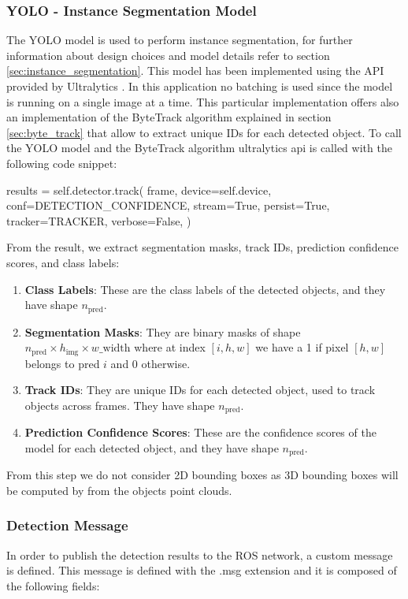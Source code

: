 \subsubsection[YOLO]{YOLO - Instance Segmentation Model}
The YOLO model is used to perform instance segmentation, for further information about 
design choices and model details refer to section \ref{sec:instance_segmentation}.
This model has been implemented using the API provided by Ultralytics \cite{ultralytics_yolo_2023}.
In this application no batching is used since the model is running on a single image at a time.
This particular implementation offers also an implementation of the ByteTrack algorithm explained in section 
\ref{sec:byte_track} that allow to extract unique IDs for each detected object.
To call the YOLO model and the ByteTrack algorithm ultralytics api is called with the following code snippet:
\begin{python}
results = self.detector.track(
                frame,
                device=self.device,
                conf=DETECTION_CONFIDENCE,
                stream=True,
                persist=True,
                tracker=TRACKER,
                verbose=False,
            )
\end{python}
From the result, we extract segmentation masks, track IDs, prediction confidence scores, and class labels:
\begin{enumerate}
    \item \textbf{Class Labels}: These are the class labels of the detected objects, and they have shape \( n_{\text{pred}} \).
    \item \textbf{Segmentation Masks}: They are binary masks of shape \( n_{\text{pred}} \times h_{\text{img}} \times w\_{\text{width}} \) where at index \( [i, h, w] \) we have a 1 if pixel \( [h, w] \) belongs to pred \( i \) and 0 otherwise.
    \item \textbf{Track IDs}: They are unique IDs for each detected object, used to track objects across frames. They have shape \( n_{\text{pred}} \).
    \item \textbf{Prediction Confidence Scores}: These are the confidence scores of the model for each detected object, and they have shape \( n_{\text{pred}} \).
\end{enumerate}
From this step we do not consider 2D bounding boxes as 3D bounding boxes will be computed by from the objects point clouds.

\subsubsection[Detection Message]{Detection Message}
In order to publish the detection results to the ROS network, a custom message is defined.
This message is defined with the .msg extension and it is composed of the following fields:


